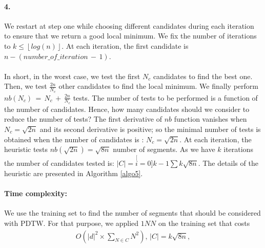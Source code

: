 \begin{center}
\end{center}
\paragraph{4.} We restart at step one while choosing
different candidates during each iteration to ensure that we return a good
local minimum. We fix the number of iterations to $k \leq \left\lfloor log(n)\right\rfloor $. At each iteration, the first candidate is $n-(number \_ of \_ iteration \,-\, 1)$.


\paragraph{}In short, in the worst case, we test the first $N_{c}$ candidates to find the best one.
Then, we test $\frac{2n}{N_{c}}$ other candidates to find the local minimum.
We finally perform $nb(N_{c})\, =\, N_{c}\, +\, \frac{2n}{N_{c}}$ tests. The number of tests
 to be performed is a function of the number of candidates. Hence, how many
candidates should we consider to reduce the number of tests? The first
derivative of $nb$ function  vanishes when $N_{c}=\sqrt{2n}$ and its second derivative is
positive; so the minimal number of tests is obtained when the number of candidates is : 
$N_{c}=\sqrt{2n}$. At each
iteration, the heuristic tests $nb(\sqrt{2n})=\sqrt{8n}$ number of segments. As we have $k$
iterations the number of candidates tested is: $|C|=\stackrel[i=0]{k-1}{\sum}{\textstyle
k\sqrt{8n}}$. The details of the heuristic are presented in Algorithm \ref{algo5}.

\paragraph{Time complexity: }
We use the training set to find the number of segments that should be considered
with PDTW. For that purpose, we applied $1NN$ on the training set that costs
\begin{eqnarray}
O(|d|^{2} \times \underset{N\in C}{\sum}{\displaystyle
N^{2}}),\, |C|= k\sqrt{8n},
\end{eqnarray}


